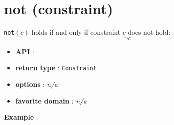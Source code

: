 \label{not}
\hypertarget{not}{}

\section{not (constraint)}\label{not:notconstraint}\hypertarget{not:notconstraint}{}
\begin{notedef}
  \texttt{not}$(c)$ holds if and only if constraint $c$ does not hold:
$$\neg c$$
\end{notedef}
\begin{itemize}
	\item \textbf{API} : 
	\item \textbf{return type} : \texttt{Constraint}
	\item \textbf{options} : \emph{n/a}
	\item \textbf{favorite domain} : \emph{n/a}
\end{itemize}

\textbf{Example} : 

